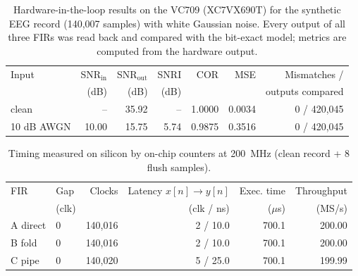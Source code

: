 \begin{table}[t]\centering
\caption{Hardware-in-the-loop results on the VC709 (XC7VX690T) for the synthetic EEG record (140,007 samples) with white Gaussian noise. Every output of all three FIRs was read back and compared with the bit-exact model; metrics are computed from the hardware output.}
\label{tab:hw_eeg}\small
\begin{tabular}{lrrrrrr}\hline
Input & SNR$_\mathrm{in}$ & SNR$_\mathrm{out}$ & SNRI & COR & MSE & Mismatches / \\
 & (dB) & (dB) & (dB) & & & outputs compared \\ \hline
clean & -- & 35.92 & -- & 1.0000 & 0.0034 & 0 / 420,045 \\
10 dB AWGN & 10.00 & 15.75 & 5.74 & 0.9875 & 0.3516 & 0 / 420,045 \\
\hline\end{tabular}\end{table}

\begin{table}[t]\centering
\caption{Timing measured on silicon by on-chip counters at 200~MHz (clean record + 8 flush samples).}
\label{tab:hw_timing}\small
\begin{tabular}{llrrrr}\hline
FIR & Gap & Clocks & Latency $x[n]\!\to\!y[n]$ & Exec. time & Throughput \\
 & (clk) & & (clk / ns) & ($\mu$s) & (MS/s) \\ \hline
A direct & 0 & 140,016 & 2 / 10.0 & 700.1 & 200.00 \\
B fold & 0 & 140,016 & 2 / 10.0 & 700.1 & 200.00 \\
C pipe & 0 & 140,020 & 5 / 25.0 & 700.1 & 199.99 \\
\hline\end{tabular}\end{table}

